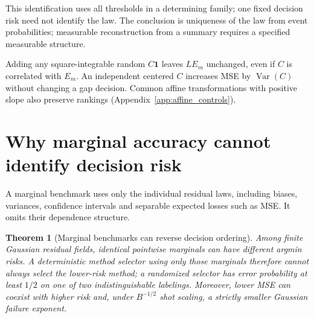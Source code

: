 \documentclass[a4paper,onecolumn,unpublished,nopdfoutputerror]{quantumarticle}
\theoremstyle{plain}
\newtheorem{theorem}{Theorem}[section]
\theoremstyle{definition}
\newcommand{\Var}{\operatorname{Var}}
\newcommand{\1}{\mathbf{1}}
\begin{document}
This identification uses all thresholds in a determining family; one fixed decision risk need not identify the law. The conclusion is uniqueness of the law from event probabilities; measurable reconstruction from a summary requires a specified measurable structure.

Adding any square-integrable random $C\1$ leaves $LE_m$ unchanged, even if $C$ is correlated with $E_m$. An independent centered $C$ increases MSE by $\Var(C)$ without changing a gap decision. Common affine transformations with positive slope also preserve rankings (Appendix~\ref{app:affine_controls}).


\section{Why marginal accuracy cannot identify decision risk}
\label{sec:marginal_obstruction}

A marginal benchmark uses only the individual residual laws, including biases, variances, confidence intervals and separable expected losses such as MSE. It omits their dependence structure.

\begin{theorem}[Marginal benchmarks can reverse decision ordering]
\label{thm:nogo_marginal}
Among finite Gaussian residual fields, identical pointwise marginals can have different argmin risks. A deterministic method selector using only those marginals therefore cannot always select the lower-risk method; a randomized selector has error probability at least $1/2$ on one of two indistinguishable labelings. Moreover, lower MSE can coexist with higher risk and, under $B^{-1/2}$ shot scaling, a strictly smaller Gaussian failure exponent.
\end{theorem}
\end{document}
